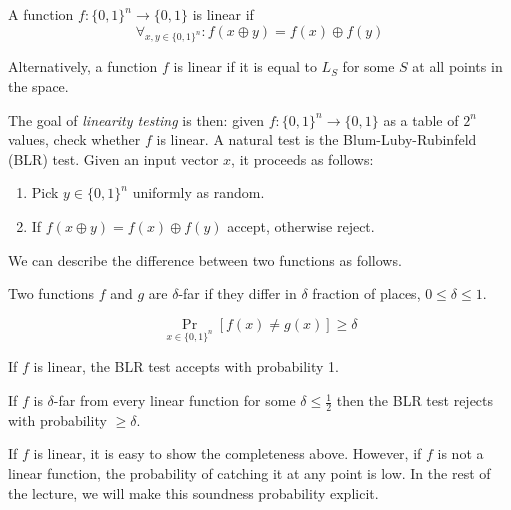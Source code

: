 \documentclass[12pt]{article}
\begin{document}
\begin{definition}

A function $f: \{0,1\}^n \rightarrow \{0,1\}$ is linear if
\begin{displaymath}
\forall_{x,y \in \{0,1\}^n}: f(x \oplus y) = f(x) \oplus f(y)
\end{displaymath}

Alternatively, a function $f$ is linear if it is equal to $L_S$ for some
$S$ at all points in the space.
\end{definition}

The goal of \emph{linearity testing} is then:
given $f: \{0,1\}^n \rightarrow \{0,1\}$ as a table of $2^n$ values,
check whether $f$ is linear. A natural test is the
Blum-Luby-Rubinfeld (BLR) test. Given an input vector $x$, it proceeds as
follows:

\begin{enumerate}
\item Pick $y \in \{0,1\}^n$ uniformly as random.
\item If $f(x \oplus y) = f(x) \oplus f(y)$ accept, otherwise reject.
\end{enumerate}

We can describe the difference between two functions
as follows.

\begin{definition}
Two functions $f$ and $g$ are $\delta$-far if they differ in $\delta$ fraction
of places, $0 \le \delta \le 1$.

\begin{displaymath}
\Pr_{x \in \{0,1\}^n}{\left[ f(x) \ne g(x) \right]} \ge \delta
\end{displaymath}
\end{definition}

\begin{theorem}
If $f$ is linear, the BLR test accepts with probability 1.
\end{theorem}

\begin{theorem}
If $f$ is $\delta$-far from every linear function for some
$\delta \le \frac{1}{2}$ then the BLR test rejects with probability
$\ge \delta$.
\end{theorem}

If $f$ is linear, it is easy to show the completeness above.
However, if $f$ is not a linear function, the probability of catching it
at any point is low. In the rest of the lecture, we will make this
soundness probability explicit.
\end{document}
